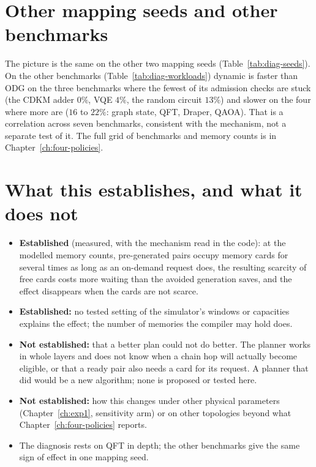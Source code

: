 \section{Other mapping seeds and other benchmarks}


The picture is the same on the other two mapping seeds (Table~\ref{tab:diag-seeds}). On the other benchmarks (Table~\ref{tab:diag-workloads}) dynamic is faster than ODG on the three benchmarks where the fewest of its admission checks are stuck (the CDKM adder $0\%$, VQE $4\%$, the random circuit $13\%$)
and slower on the four where more are ($16$ to $22\%$: graph state, QFT, Draper, QAOA). That is a correlation across seven benchmarks, consistent with the mechanism, not a separate test of it. The full grid of benchmarks and memory counts is in Chapter~\ref{ch:four-policies}.

\section{What this establishes, and what it does not}
\begin{itemize}
  \item \textbf{Established} (measured, with the mechanism read in the code): at the modelled memory counts, pre-generated pairs occupy memory cards for several times as long as an on-demand request does, the
    resulting scarcity of free cards costs more waiting than the avoided generation saves, and the effect disappears when the cards are not scarce.
  \item \textbf{Established:} no tested setting of the simulator's windows or capacities explains the effect; the number of memories the compiler may hold does.
  \item \textbf{Not established:} that a better plan could not do better. The planner works in whole layers and does not know when a chain hop will actually become eligible, or that a ready pair also needs a card for its request.
    A planner that did would be a new algorithm; none is proposed or tested here.
  \item \textbf{Not established:} how this changes under other physical parameters (Chapter~\ref{ch:exp1}, sensitivity arm) or on other topologies beyond what Chapter~\ref{ch:four-policies} reports.
  \item The diagnosis rests on QFT in depth; the other benchmarks give the same sign of effect in one mapping seed.
\end{itemize}
